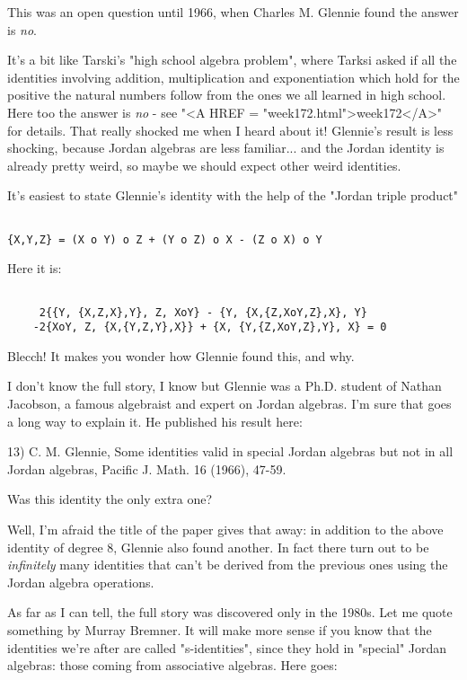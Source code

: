 This was an open question until 1966, when Charles M. Glennie found 
the answer is \emph{no}.


It's a bit like Tarski's "high school algebra problem", where
Tarksi asked if all the identities involving addition, multiplication
and exponentiation which hold for the positive the natural numbers
follow from the ones we all learned in high school.  Here too the answer
is \emph{no} - see "<A HREF = "week172.html">week172</A>"
for details.  That really shocked me when I heard about it!  Glennie's
result is less shocking, because Jordan algebras are less
familiar... and the Jordan identity is already pretty weird, so maybe we
should expect other weird identities.

It's easiest to state Glennie's identity with the help of
the "Jordan triple product"


\begin{verbatim}

{X,Y,Z} = (X o Y) o Z + (Y o Z) o X - (Z o X) o Y
\end{verbatim}
    
Here it is:


\begin{verbatim}

     2{{Y, {X,Z,X},Y}, Z, XoY} - {Y, {X,{Z,XoY,Z},X}, Y}
    -2{XoY, Z, {X,{Y,Z,Y},X}} + {X, {Y,{Z,XoY,Z},Y}, X} = 0 
\end{verbatim}
    
Blecch!  It makes you wonder how Glennie found this, and why.

I don't know the full story, I know but Glennie was a Ph.D. student of
Nathan Jacobson, a famous algebraist and expert on Jordan algebras.  I'm
sure that goes a long way to explain it.  He published his result here:

13) C. M. Glennie, Some identities valid in special Jordan
algebras but not in all Jordan algebras, Pacific J. Math. 16
(1966), 47-59.

Was this identity the only extra one?

Well, I'm afraid the title of the paper gives that away: in addition to
the above identity of degree 8, Glennie also found another.  In fact
there turn out to be \emph{infinitely} many identities that can't be derived
from the previous ones using the Jordan algebra operations.

As far as I can tell, the full story was discovered only in the 1980s.
Let me quote something by Murray Bremner.  It will make more sense if
you know that the identities we're after are called "s-identities",
since they hold in "special" Jordan algebras: those coming from
associative algebras.  Here goes:

